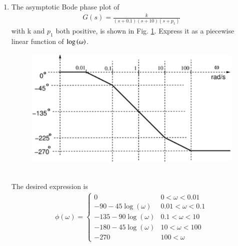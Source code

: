 \begin{enumerate}[label=\thesubsection.\arabic*.,ref=\thesubsection.\theenumi]


\item The asymptotic Bode phase plot of 
%
\begin{align}
\label{eq:ee18btech11037_gs}
G(s) = \frac{k}{(s+0.1)(s+10)(s+{p_1})}
\end{align}
%
with k and $p_1$ both positive, is shown in Fig. \ref{fig:ee18btech11037}.  Express it as a piecewise linear function of $\log \left(\omega\right)$.
\begin{figure}[!ht]
\centering
\includegraphics[width=\columnwidth]{./figs/ee18btech11037/ee18btech11037.eps}
\caption{}
\label{fig:ee18btech11037}
\end{figure}
\\
\solution The desired expression is
\begin{align}
\label{eq:ee18btech11037_totalphase}
 \phi(\omega) = 
 \begin{cases} 
        0 & 0<\omega<0.01 \\
      -90-45\log(\omega)& 0.01<\omega<0.1 \\
      -135-90\log(\omega)& 0.1<\omega<10 \\
      -180-45\log(\omega)& 10<\omega<100 \\
      -270 & 100<\omega  
 \end{cases}
\end{align}


\end{enumerate}
